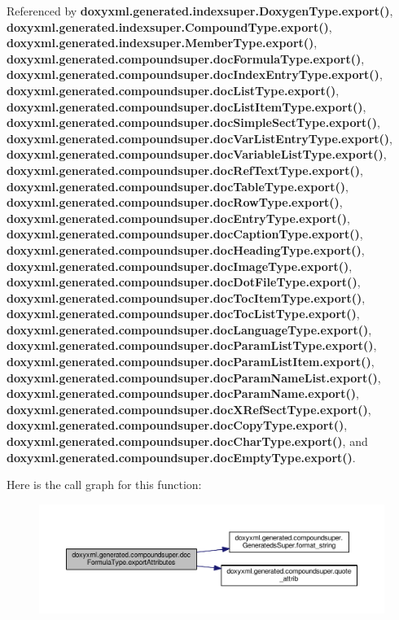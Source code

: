 Referenced by {\bf doxyxml.\+generated.\+indexsuper.\+Doxygen\+Type.\+export()}, {\bf doxyxml.\+generated.\+indexsuper.\+Compound\+Type.\+export()}, {\bf doxyxml.\+generated.\+indexsuper.\+Member\+Type.\+export()}, {\bf doxyxml.\+generated.\+compoundsuper.\+doc\+Formula\+Type.\+export()}, {\bf doxyxml.\+generated.\+compoundsuper.\+doc\+Index\+Entry\+Type.\+export()}, {\bf doxyxml.\+generated.\+compoundsuper.\+doc\+List\+Type.\+export()}, {\bf doxyxml.\+generated.\+compoundsuper.\+doc\+List\+Item\+Type.\+export()}, {\bf doxyxml.\+generated.\+compoundsuper.\+doc\+Simple\+Sect\+Type.\+export()}, {\bf doxyxml.\+generated.\+compoundsuper.\+doc\+Var\+List\+Entry\+Type.\+export()}, {\bf doxyxml.\+generated.\+compoundsuper.\+doc\+Variable\+List\+Type.\+export()}, {\bf doxyxml.\+generated.\+compoundsuper.\+doc\+Ref\+Text\+Type.\+export()}, {\bf doxyxml.\+generated.\+compoundsuper.\+doc\+Table\+Type.\+export()}, {\bf doxyxml.\+generated.\+compoundsuper.\+doc\+Row\+Type.\+export()}, {\bf doxyxml.\+generated.\+compoundsuper.\+doc\+Entry\+Type.\+export()}, {\bf doxyxml.\+generated.\+compoundsuper.\+doc\+Caption\+Type.\+export()}, {\bf doxyxml.\+generated.\+compoundsuper.\+doc\+Heading\+Type.\+export()}, {\bf doxyxml.\+generated.\+compoundsuper.\+doc\+Image\+Type.\+export()}, {\bf doxyxml.\+generated.\+compoundsuper.\+doc\+Dot\+File\+Type.\+export()}, {\bf doxyxml.\+generated.\+compoundsuper.\+doc\+Toc\+Item\+Type.\+export()}, {\bf doxyxml.\+generated.\+compoundsuper.\+doc\+Toc\+List\+Type.\+export()}, {\bf doxyxml.\+generated.\+compoundsuper.\+doc\+Language\+Type.\+export()}, {\bf doxyxml.\+generated.\+compoundsuper.\+doc\+Param\+List\+Type.\+export()}, {\bf doxyxml.\+generated.\+compoundsuper.\+doc\+Param\+List\+Item.\+export()}, {\bf doxyxml.\+generated.\+compoundsuper.\+doc\+Param\+Name\+List.\+export()}, {\bf doxyxml.\+generated.\+compoundsuper.\+doc\+Param\+Name.\+export()}, {\bf doxyxml.\+generated.\+compoundsuper.\+doc\+X\+Ref\+Sect\+Type.\+export()}, {\bf doxyxml.\+generated.\+compoundsuper.\+doc\+Copy\+Type.\+export()}, {\bf doxyxml.\+generated.\+compoundsuper.\+doc\+Char\+Type.\+export()}, and {\bf doxyxml.\+generated.\+compoundsuper.\+doc\+Empty\+Type.\+export()}.



Here is the call graph for this function\+:
\nopagebreak
\begin{figure}[H]
\begin{center}
\leavevmode
\includegraphics[width=350pt]{d5/d88/classdoxyxml_1_1generated_1_1compoundsuper_1_1docFormulaType_afcf28718d00e65796b94e20f14e13eae_cgraph}
\end{center}
\end{figure}




